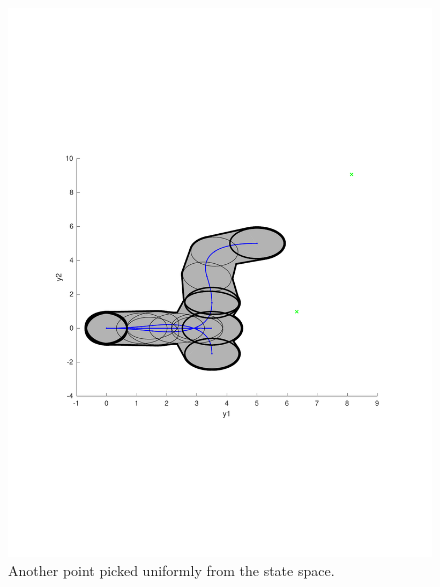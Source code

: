 \begin{figure}
\includegraphics[scale=.5]{figures/rrtfunnel/euclidean-distance-closest-funnel3}
\caption{Another point picked uniformly from the state space.}
\end{figure}

